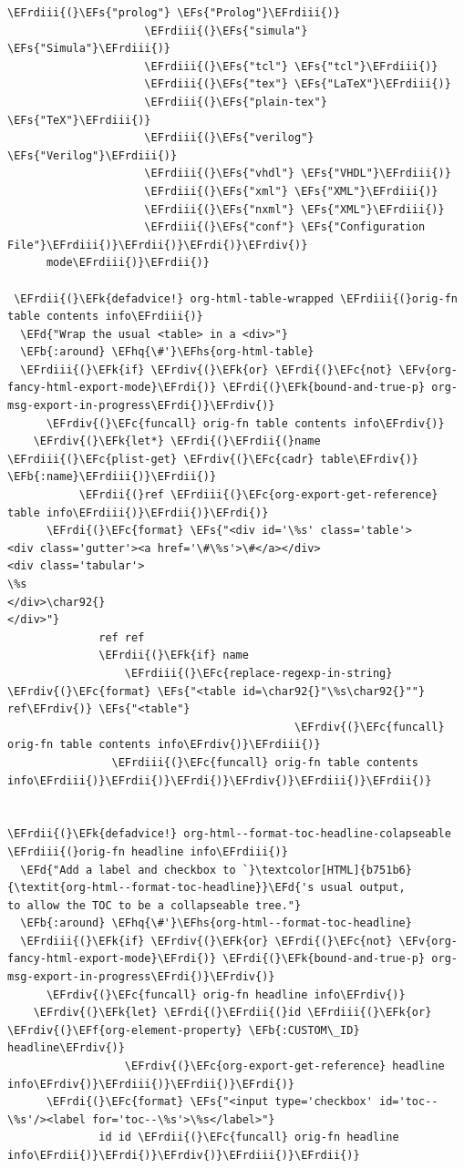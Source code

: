 \documentclass{scrartcl}
\newcommand{\EFk}[1]{\textcolor{EFk}{#1}} %
\newcommand{\EFd}[1]{\textcolor{EFd}{\textit{#1}}} %
\newcommand{\EFs}[1]{\textcolor{EFs}{#1}} %
\newcommand{\EFb}[1]{\textcolor{EFb}{#1}} %
\newcommand{\EFc}[1]{\textcolor{EFc}{#1}} %
\newcommand{\EFv}[1]{\textcolor{EFv}{#1}} %
\newcommand{\EFf}[1]{\textcolor{EFf}{#1}} %
\newcommand{\EFhq}[1]{\textcolor{EFhq}{#1}} %
\newcommand{\EFhs}[1]{\textcolor{EFhs}{#1}} %
\newcommand{\EFrdi}[1]{\textcolor{EFrdi}{#1}} %
\newcommand{\EFrdii}[1]{\textcolor{EFrdii}{#1}} %
\newcommand{\EFrdiii}[1]{\textcolor{EFrdiii}{#1}} %
\newcommand{\EFrdiv}[1]{\textcolor{EFrdiv}{#1}} %
\begin{document}
\begin{Code}
\begin{Verbatim}[]
                     \EFrdiii{(}\EFs{"prolog"} \EFs{"Prolog"}\EFrdiii{)}
                     \EFrdiii{(}\EFs{"simula"} \EFs{"Simula"}\EFrdiii{)}
                     \EFrdiii{(}\EFs{"tcl"} \EFs{"tcl"}\EFrdiii{)}
                     \EFrdiii{(}\EFs{"tex"} \EFs{"LaTeX"}\EFrdiii{)}
                     \EFrdiii{(}\EFs{"plain-tex"} \EFs{"TeX"}\EFrdiii{)}
                     \EFrdiii{(}\EFs{"verilog"} \EFs{"Verilog"}\EFrdiii{)}
                     \EFrdiii{(}\EFs{"vhdl"} \EFs{"VHDL"}\EFrdiii{)}
                     \EFrdiii{(}\EFs{"xml"} \EFs{"XML"}\EFrdiii{)}
                     \EFrdiii{(}\EFs{"nxml"} \EFs{"XML"}\EFrdiii{)}
                     \EFrdiii{(}\EFs{"conf"} \EFs{"Configuration File"}\EFrdiii{)}\EFrdii{)}\EFrdi{)}\EFrdiv{)}
      mode\EFrdiii{)}\EFrdii{)}

 \EFrdii{(}\EFk{defadvice!} org-html-table-wrapped \EFrdiii{(}orig-fn table contents info\EFrdiii{)}
  \EFd{"Wrap the usual <table> in a <div>"}
  \EFb{:around} \EFhq{\#'}\EFhs{org-html-table}
  \EFrdiii{(}\EFk{if} \EFrdiv{(}\EFk{or} \EFrdi{(}\EFc{not} \EFv{org-fancy-html-export-mode}\EFrdi{)} \EFrdi{(}\EFk{bound-and-true-p} org-msg-export-in-progress\EFrdi{)}\EFrdiv{)}
      \EFrdiv{(}\EFc{funcall} orig-fn table contents info\EFrdiv{)}
    \EFrdiv{(}\EFk{let*} \EFrdi{(}\EFrdii{(}name \EFrdiii{(}\EFc{plist-get} \EFrdiv{(}\EFc{cadr} table\EFrdiv{)} \EFb{:name}\EFrdiii{)}\EFrdii{)}
           \EFrdii{(}ref \EFrdiii{(}\EFc{org-export-get-reference} table info\EFrdiii{)}\EFrdii{)}\EFrdi{)}
      \EFrdi{(}\EFc{format} \EFs{"<div id='\%s' class='table'>
<div class='gutter'><a href='\#\%s'>\#</a></div>
<div class='tabular'>
\%s
</div>\char92{}
</div>"}
              ref ref
              \EFrdii{(}\EFk{if} name
                  \EFrdiii{(}\EFc{replace-regexp-in-string} \EFrdiv{(}\EFc{format} \EFs{"<table id=\char92{}"\%s\char92{}""} ref\EFrdiv{)} \EFs{"<table"}
                                            \EFrdiv{(}\EFc{funcall} orig-fn table contents info\EFrdiv{)}\EFrdiii{)}
                \EFrdiii{(}\EFc{funcall} orig-fn table contents info\EFrdiii{)}\EFrdii{)}\EFrdi{)}\EFrdiv{)}\EFrdiii{)}\EFrdii{)}


\EFrdii{(}\EFk{defadvice!} org-html--format-toc-headline-colapseable \EFrdiii{(}orig-fn headline info\EFrdiii{)}
  \EFd{"Add a label and checkbox to `}\textcolor[HTML]{b751b6}{\textit{org-html--format-toc-headline}}\EFd{'s usual output,
to allow the TOC to be a collapseable tree."}
  \EFb{:around} \EFhq{\#'}\EFhs{org-html--format-toc-headline}
  \EFrdiii{(}\EFk{if} \EFrdiv{(}\EFk{or} \EFrdi{(}\EFc{not} \EFv{org-fancy-html-export-mode}\EFrdi{)} \EFrdi{(}\EFk{bound-and-true-p} org-msg-export-in-progress\EFrdi{)}\EFrdiv{)}
      \EFrdiv{(}\EFc{funcall} orig-fn headline info\EFrdiv{)}
    \EFrdiv{(}\EFk{let} \EFrdi{(}\EFrdii{(}id \EFrdiii{(}\EFk{or} \EFrdiv{(}\EFf{org-element-property} \EFb{:CUSTOM\_ID} headline\EFrdiv{)}
                  \EFrdiv{(}\EFc{org-export-get-reference} headline info\EFrdiv{)}\EFrdiii{)}\EFrdii{)}\EFrdi{)}
      \EFrdi{(}\EFc{format} \EFs{"<input type='checkbox' id='toc--\%s'/><label for='toc--\%s'>\%s</label>"}
              id id \EFrdii{(}\EFc{funcall} orig-fn headline info\EFrdii{)}\EFrdi{)}\EFrdiv{)}\EFrdiii{)}\EFrdii{)}


\end{Verbatim}
\end{Code}
\end{document}
